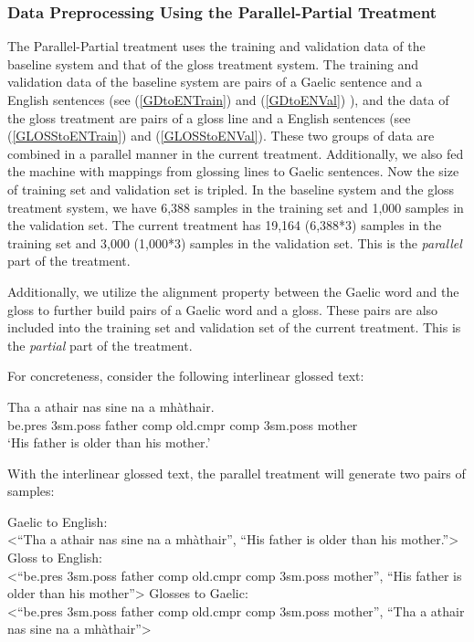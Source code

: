 \documentclass[a4paper]{article}
\begin{document}
\subsubsection{Data Preprocessing Using the Parallel-Partial Treatment}
The Parallel-Partial treatment uses the training and validation data of the baseline system and that of the gloss treatment system.  
The training and validation data of the baseline system are pairs of a Gaelic sentence and a English sentences (see (\ref{GDtoENTrain}) and (\ref{GDtoENVal}) ), 
and the data of the gloss treatment are pairs of a gloss line and a English sentences (see (\ref{GLOSStoENTrain}) and (\ref{GLOSStoENVal}). 
These two groups of data are combined in a parallel manner in the current treatment. Additionally, we also fed the machine with mappings from glossing lines to Gaelic sentences. Now the size of training set and validation set is tripled. In the baseline system and the gloss treatment system, we have 6,388 samples in the training set and 1,000 samples in the validation set. The current treatment has 19,164 (6,388*3) samples in the training set and 3,000 (1,000*3) samples in the validation set. This is the \textit{parallel} part of the treatment. 

Additionally, we utilize the alignment property between the Gaelic word and the gloss to further build pairs of a Gaelic word and a gloss. These pairs are also included into the training set and validation set of the current treatment. This is the \textit{partial} part of the treatment. 

For concreteness, consider the following interlinear glossed text: 
\begin{exe}  
\ex \gll    Tha a athair nas sine na a mh\`athair.\\  
            be.pres 3sm.poss father comp old.cmpr comp 3sm.poss mother\\  
    \glt    `His father is older than his mother.'  
\end{exe}

With the interlinear glossed text, the parallel treatment will generate two pairs of samples:

\begin{exe}
	\ex \label{21}
	\begin{xlist}
		\ex Gaelic to English: \\<``Tha a athair nas sine na a mh\`athair'', ``His father is older than his mother.''>
		\ex Gloss to English: \\<``be.pres 3sm.poss father comp old.cmpr comp 3sm.poss mother'', ``His father is older than his mother''>
		\ex Glosses to Gaelic: \\<``be.pres 3sm.poss father comp old.cmpr comp 3sm.poss mother'', ``Tha a athair nas sine na a mh\`athair''>
	\end{xlist}
\end{exe}
\end{document}
